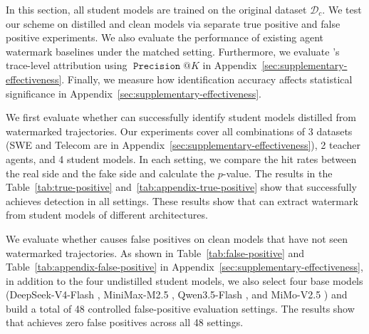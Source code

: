 In this section, all student models are trained on the original  dataset $\mathcal{D}_c$. We test our scheme on distilled and clean models via separate true positive and false positive experiments. We also evaluate the performance of existing agent watermark baselines under the matched setting. Furthermore, we evaluate \name{}'s trace-level attribution using $\operatorname{\mathtt{Precision}}@K$ in Appendix~\ref{sec:supplementary-effectiveness}. Finally, we measure how identification accuracy affects statistical significance in Appendix~\ref{sec:supplementary-effectiveness}.



 We first evaluate whether \name{} can successfully identify student models distilled from watermarked trajectories. Our experiments cover all combinations of 3 datasets (SWE and Telecom are in Appendix~\ref{sec:supplementary-effectiveness}), 2 teacher agents, and 4 student models. In each setting, we compare the hit rates between the real side and the fake side and calculate the $p$-value. The results in the Table~\ref{tab:true-positive} and~\ref{tab:appendix-true-positive} show that \name{} successfully achieves detection in all settings. These results show that \name{} can extract watermark from student models of different architectures.


 We evaluate whether \name{} causes false positives on clean models that have not seen watermarked trajectories. As shown in Table~\ref{tab:false-positive} and Table~\ref{tab:appendix-false-positive} in Appendix~\ref{sec:supplementary-effectiveness}, in addition to the four undistilled student models, we also select four base models (DeepSeek-V4-Flash \cite{xu2026deepseek}, MiniMax-M2.5 \cite{chen2026minimax}, Qwen3.5-Flash \cite{yang2025qwen3}, and MiMo-V2.5 \cite{xiao2026mimo}) and build a total of 48 controlled false-positive evaluation settings. The results show that \name{} achieves zero false positives across all 48 settings.

